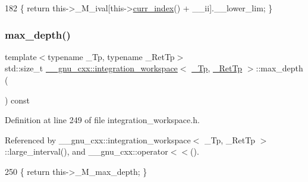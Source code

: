 \begin{DoxyCode}
182       \{ \textcolor{keywordflow}{return} this->\_M\_ival[this->\hyperlink{class____gnu__cxx_1_1integration__workspace_a51a384b1777615943add69f1895454f5}{curr\_index}() + \_\_ii].\_\_lower\_lim; \}
\end{DoxyCode}
\mbox{\label{class____gnu__cxx_1_1integration__workspace_a18115495f63c8a3fc27205cad0ba8869}} 
\subsubsection{\texorpdfstring{max\+\_\+depth()}{max\_depth()}}
{\footnotesize\ttfamily template$<$typename \+\_\+\+Tp, typename \+\_\+\+Ret\+Tp$>$ \\
std\+::size\+\_\+t \hyperlink{class____gnu__cxx_1_1integration__workspace}{\+\_\+\+\_\+gnu\+\_\+cxx\+::integration\+\_\+workspace}$<$ \hyperlink{namespace____gnu__cxx_a3b19a9c800ca194374ef9172290f7d79}{\+\_\+\+Tp}, \hyperlink{namespace____gnu__cxx_a886e03ece3d53ff7fa6c098a40f93fa5}{\+\_\+\+Ret\+Tp} $>$\+::max\+\_\+depth (\begin{DoxyParamCaption}{ }\end{DoxyParamCaption}) const\hspace{0.3cm}{\ttfamily [inline]}}



Definition at line 249 of file integration\+\_\+workspace.\+h.



Referenced by \+\_\+\+\_\+gnu\+\_\+cxx\+::integration\+\_\+workspace$<$ \+\_\+\+Tp, \+\_\+\+Ret\+Tp $>$\+::large\+\_\+interval(), and \+\_\+\+\_\+gnu\+\_\+cxx\+::operator$<$$<$().


\begin{DoxyCode}
250       \{ \textcolor{keywordflow}{return} this->\_M\_max\_depth; \}
\end{DoxyCode}
\mbox{\label{class____gnu__cxx_1_1integration__workspace_a5e175d0bd16b95c51fd39606ce65c6fb}} 
